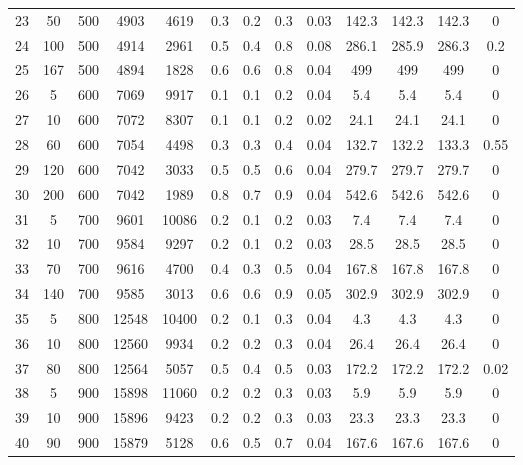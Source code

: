 \documentclass[11pt]{article}
\begin{document}
\begin{table}[]
{\begin{tabular}{ccccc|cccc|cccc}
			\rowcolor[HTML]{EFEFEF} 
			23 & 50  & 500 & 4903  & 4619  & 0.3 & 0.2 & 0.3 & 0.03 & 142.3 & 142.3 & 142.3 & 0    \\
			\rowcolor[HTML]{EFEFEF} 
			24 & 100 & 500 & 4914  & 2961  & 0.5 & 0.4 & 0.8 & 0.08 & 286.1 & 285.9 & 286.3 & 0.2  \\
			\rowcolor[HTML]{EFEFEF} 
			25 & 167 & 500 & 4894  & 1828  & 0.6 & 0.6 & 0.8 & 0.04 & 499   & 499   & 499   & 0    \\
			26 & 5   & 600 & 7069  & 9917  & 0.1 & 0.1 & 0.2 & 0.04 & 5.4   & 5.4   & 5.4   & 0    \\
			27 & 10  & 600 & 7072  & 8307  & 0.1 & 0.1 & 0.2 & 0.02 & 24.1  & 24.1  & 24.1  & 0    \\
			28 & 60  & 600 & 7054  & 4498  & 0.3 & 0.3 & 0.4 & 0.04 & 132.7 & 132.2 & 133.3 & 0.55 \\
			29 & 120 & 600 & 7042  & 3033  & 0.5 & 0.5 & 0.6 & 0.04 & 279.7 & 279.7 & 279.7 & 0    \\
			30 & 200 & 600 & 7042  & 1989  & 0.8 & 0.7 & 0.9 & 0.04 & 542.6 & 542.6 & 542.6 & 0    \\
			\rowcolor[HTML]{EFEFEF} 
			31 & 5   & 700 & 9601  & 10086 & 0.2 & 0.1 & 0.2 & 0.03 & 7.4   & 7.4   & 7.4   & 0    \\
			\rowcolor[HTML]{EFEFEF} 
			32 & 10  & 700 & 9584  & 9297  & 0.2 & 0.1 & 0.2 & 0.03 & 28.5  & 28.5  & 28.5  & 0    \\
			\rowcolor[HTML]{EFEFEF} 
			33 & 70  & 700 & 9616  & 4700  & 0.4 & 0.3 & 0.5 & 0.04 & 167.8 & 167.8 & 167.8 & 0    \\
			\rowcolor[HTML]{EFEFEF} 
			34 & 140 & 700 & 9585  & 3013  & 0.6 & 0.6 & 0.9 & 0.05 & 302.9 & 302.9 & 302.9 & 0    \\
			35 & 5   & 800 & 12548 & 10400 & 0.2 & 0.1 & 0.3 & 0.04 & 4.3   & 4.3   & 4.3   & 0    \\
			36 & 10  & 800 & 12560 & 9934  & 0.2 & 0.2 & 0.3 & 0.04 & 26.4  & 26.4  & 26.4  & 0    \\
			37 & 80  & 800 & 12564 & 5057  & 0.5 & 0.4 & 0.5 & 0.03 & 172.2 & 172.2 & 172.2 & 0.02 \\
			\rowcolor[HTML]{EFEFEF} 
			38 & 5   & 900 & 15898 & 11060 & 0.2 & 0.2 & 0.3 & 0.03 & 5.9   & 5.9   & 5.9   & 0    \\
			\rowcolor[HTML]{EFEFEF} 
			39 & 10  & 900 & 15896 & 9423  & 0.2 & 0.2 & 0.3 & 0.03 & 23.3  & 23.3  & 23.3  & 0    \\
			\rowcolor[HTML]{EFEFEF} 
			40 & 90  & 900 & 15879 & 5128  & 0.6 & 0.5 & 0.7 & 0.04 & 167.6 & 167.6 & 167.6 & 0   
		\end{tabular}%
	}
\end{table}
\end{document}
